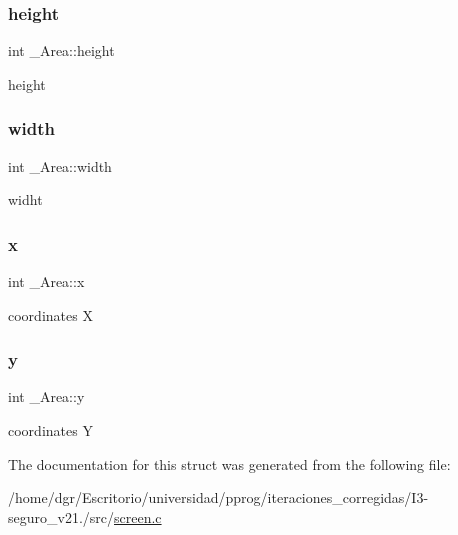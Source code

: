 \subsubsection{\texorpdfstring{height}{height}}
{\footnotesize\ttfamily int \+\_\+\+Area\+::height}

height \mbox{\label{struct__Area_aa2f753fc3d254821603ac4512db814f1}} 
\subsubsection{\texorpdfstring{width}{width}}
{\footnotesize\ttfamily int \+\_\+\+Area\+::width}

widht \mbox{\label{struct__Area_a093b8c2929094bac88bbf5ee7db85573}} 
\subsubsection{\texorpdfstring{x}{x}}
{\footnotesize\ttfamily int \+\_\+\+Area\+::x}

coordinates X \mbox{\label{struct__Area_a867e601f05480db03237c3a17d4c77f8}} 
\subsubsection{\texorpdfstring{y}{y}}
{\footnotesize\ttfamily int \+\_\+\+Area\+::y}

coordinates Y 

The documentation for this struct was generated from the following file\+:\begin{DoxyCompactItemize}
\item 
/home/dgr/\+Escritorio/universidad/pprog/iteraciones\+\_\+corregidas/\+I3-\/seguro\+\_\+v21./src/\hyperlink{screen_8c}{screen.\+c}\end{DoxyCompactItemize}
